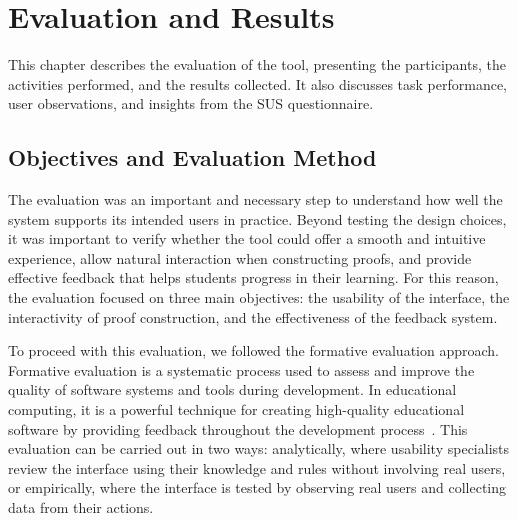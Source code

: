 %

\chapter{Evaluation and Results}
\label{chap:results_eval}

This chapter describes the evaluation of the tool, presenting the participants, the activities performed, and the results collected. It also discusses task performance, user observations, and insights from the \gls{SUS} questionnaire.

\section{Objectives and Evaluation Method}

The evaluation was an important and necessary step to understand how well the system supports its intended users in practice. Beyond testing the design choices, it was important to verify whether the tool could offer a smooth and intuitive experience, allow natural interaction when constructing proofs, and provide effective feedback that helps students progress in their learning. For this reason, the evaluation focused on three main objectives: the usability of the interface, the interactivity of proof construction, and the effectiveness of the feedback system.

To proceed with this evaluation, we followed the formative evaluation approach. Formative evaluation is a systematic process used to assess and improve the quality of software systems and tools during development. In educational computing, it is a powerful technique for creating high-quality educational software by providing feedback throughout the development process~\cite{Maslowski1999}. This evaluation can be carried out in two ways: analytically, where usability specialists review the interface using their knowledge and rules without involving real users, or empirically, where the interface is tested by observing real users and collecting data from their actions.

